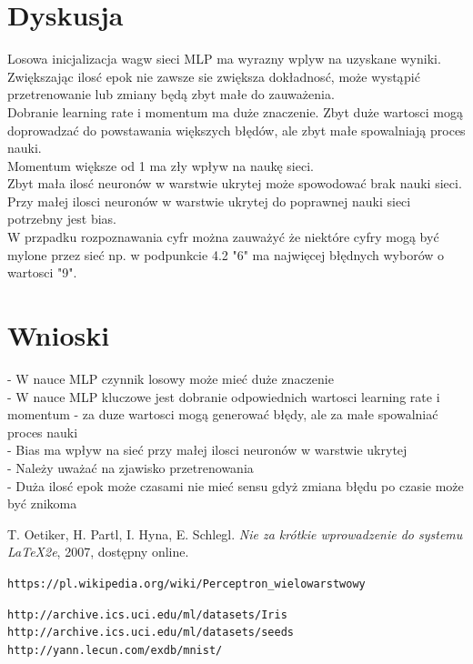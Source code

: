 \documentclass{classrep}
\begin{document}
\section{Dyskusja}
{Losowa inicjalizacja wagw sieci MLP ma wyrazny wplyw na uzyskane wyniki.\\
Zwiększając ilosć epok nie zawsze sie zwiększa dokładnosć, może wystąpić przetrenowanie lub zmiany będą zbyt małe do zauważenia.\\
Dobranie learning rate i momentum ma duże znaczenie. 
Zbyt duże wartosci mogą doprowadzać do powstawania większych błędów, ale zbyt małe spowalniają proces nauki.\\
Momentum większe od 1 ma zły wpływ na naukę sieci.\\
Zbyt mała ilosć neuronów w warstwie ukrytej może spowodować brak nauki sieci.\\
Przy małej ilosci neuronów w warstwie ukrytej do poprawnej nauki sieci potrzebny jest bias.\\
W przpadku rozpoznawania cyfr można zauważyć że niektóre cyfry mogą być mylone przez sieć np. w podpunkcie 4.2 "6" ma najwięcej błędnych wyborów o wartosci "9".\\
}

\section{Wnioski}
{- W nauce MLP czynnik losowy może mieć duże znaczenie\\
- W nauce MLP kluczowe jest dobranie odpowiednich wartosci learning rate i momentum - za duze wartosci mogą generować błędy, ale za małe spowalniać proces nauki\\
- Bias ma wpływ na sieć przy małej ilosci neuronów w warstwie ukrytej\\
- Należy uważać na zjawisko przetrenowania\\
- Duża ilosć epok może czasami nie mieć sensu gdyż zmiana błędu po czasie może być znikoma\\
}

\begin{thebibliography}{0}
   T. Oetiker, H. Partl, I. Hyna, E. Schlegl.
    \textsl{Nie za krótkie wprowadzenie do systemu \LaTeX2e}, 2007, dostępny
    online.

\texttt{https://pl.wikipedia.org/wiki/Perceptron\_wielowarstwowy}

\texttt{http://archive.ics.uci.edu/ml/datasets/Iris}
\texttt{http://archive.ics.uci.edu/ml/datasets/seeds}
\texttt{http://yann.lecun.com/exdb/mnist/}



\end{thebibliography}
\end{document}

